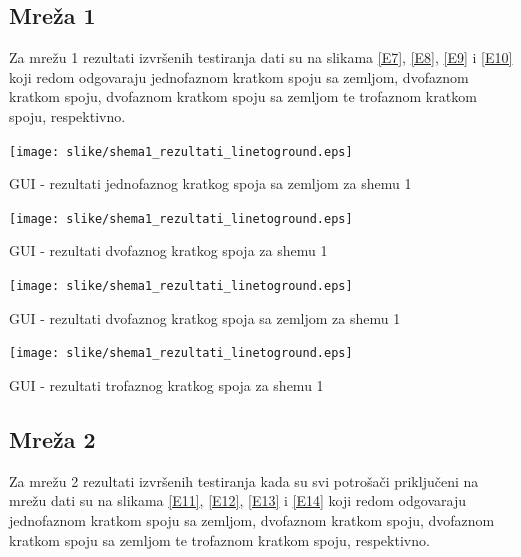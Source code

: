 \documentclass[a4paper, 12pt]{article}
\numberwithin{figure}{section}
\numberwithin{equation}{section}
\begin{document}
 \subsection{Mreža 1}
 Za mrežu 1 rezultati izvršenih testiranja dati su na slikama \ref{E7}, \ref{E8}, \ref{E9} i \ref{E10} koji redom odgovaraju jednofaznom kratkom spoju sa zemljom, dvofaznom kratkom spoju, dvofaznom kratkom spoju sa zemljom te trofaznom kratkom spoju, respektivno.
 
 \begin{center}
    \captionsetup{type=figure}
    \begin{center}
        \texttt{[image: slike/shema1\_rezultati\_linetoground.eps]}
        \caption{GUI - rezultati jednofaznog kratkog spoja sa zemljom za shemu 1}
        \label{E7}
    \end{center}
\end{center}

\begin{center}
    \captionsetup{type=figure}
    \begin{center}
        \texttt{[image: slike/shema1\_rezultati\_linetoground.eps]}
        \caption{GUI - rezultati dvofaznog kratkog spoja za shemu 1}
        \label{E8}
    \end{center}
\end{center}

\begin{center}
    \captionsetup{type=figure}
    \begin{center}
        \texttt{[image: slike/shema1\_rezultati\_linetoground.eps]}
        \caption{GUI - rezultati dvofaznog kratkog spoja sa zemljom za shemu 1}
        \label{E9}
    \end{center}
\end{center}

\begin{center}
    \captionsetup{type=figure}
    \begin{center}
        \texttt{[image: slike/shema1\_rezultati\_linetoground.eps]}
        \caption{GUI - rezultati trofaznog kratkog spoja za shemu 1}
        \label{E10}
    \end{center}
\end{center}




\subsection{Mreža 2}
 Za mrežu 2 rezultati izvršenih testiranja kada su svi potrošači priključeni na mrežu dati su na slikama \ref{E11}, \ref{E12}, \ref{E13} i \ref{E14} koji redom odgovaraju jednofaznom kratkom spoju sa zemljom, dvofaznom kratkom spoju, dvofaznom kratkom spoju sa zemljom te trofaznom kratkom spoju, respektivno.
 
\end{document}
